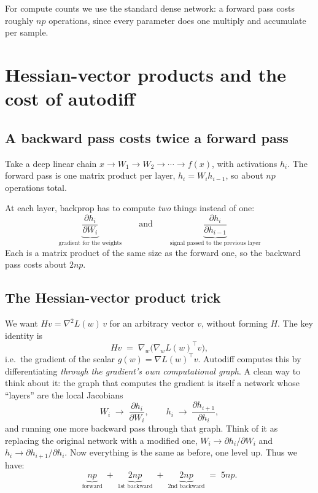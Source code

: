 \documentclass[11pt]{article}
\begin{document}
For compute counts we use the standard dense network: a forward pass costs roughly $np$ operations, since every parameter does one multiply and accumulate per sample.

\section{Hessian-vector products and the cost of autodiff}

\subsection{A backward pass costs twice a forward pass}

Take a deep linear chain $x \to W_1 \to W_2 \to \cdots \to f(x)$, with activations $h_i$. The forward pass is one matrix product per layer, $h_i = W_i h_{i-1}$, so about $np$ operations total.

At each layer, backprop has to compute \emph{two} things instead of one:
\[
\underbrace{\frac{\partial h_i}{\partial W_i}}_{\text{gradient for the weights}}
\qquad\text{and}\qquad
\underbrace{\frac{\partial h_i}{\partial h_{i-1}}}_{\text{signal passed to the previous layer}}
\]
Each is a matrix product of the same size as the forward one, so the backward pass costs about $2np$.

\subsection{The Hessian-vector product trick}

We want $Hv = \nabla^2 L(w)\, v$ for an arbitrary vector $v$, without forming $H$. The key identity is
\[
Hv \;=\; \nabla_w \big( \nabla_w L(w)^\top v \big),
\]
i.e.\ the gradient of the scalar $g(w) = \nabla L(w)^\top v$. Autodiff computes this by differentiating \emph{through the gradient's own computational graph}. A clean way to think about it: the graph that computes the gradient is itself a network whose ``layers'' are the local Jacobians
\[
W_i \;\to\; \frac{\partial h_i}{\partial W_i}, \qquad
h_i \;\to\; \frac{\partial h_{i+1}}{\partial h_i},
\]
and running one more backward pass through that graph. Think of it as replacing the original network with a modified one, $W_i \to \partial h_i / \partial W_i$ and $h_i \to \partial h_{i+1} / \partial h_i$. Now everything is the same as before, one level up. Thus we have:
\[
\underbrace{np}_{\text{forward}} \;+\; \underbrace{2np}_{\text{1st backward}} \;+\; \underbrace{2np}_{\text{2nd backward}} \;=\; 5np .
\]
\end{document}
